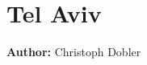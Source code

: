 \section{Tel Aviv}
\label{sec:scenario.telaviv}
\hfill \textbf{Author:} Christoph Dobler

\citep[][]{BekhorEtAl_TRB_2011}

